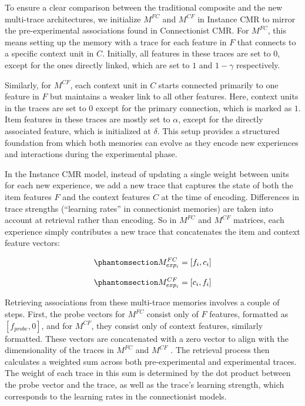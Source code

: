 \documentclass[
  letterpaper,
  11pt,
  english,
  singlespacing,
  headsepline]{MastersDoctoralThesis}
\begin{document}
To ensure a clear comparison between the traditional composite and the
new multi-trace architectures, we initialize \(M^{FC}\) and \(M^{CF}\)
in Instance CMR to mirror the pre-experimental associations found in
Connectionist CMR. For \(M^{FC}\), this means setting up the memory with
a trace for each feature in \(F\) that connects to a specific context
unit in \(C\). Initially, all features in these traces are set to \(0\),
except for the ones directly linked, which are set to \(1\) and
\(1 - \gamma\) respectively.

Similarly, for \(M^{CF}\), each context unit in \(C\) starts connected
primarily to one feature in \(F\) but maintains a weaker link to all
other features. Here, context units in the traces are set to \(0\)
except for the primary connection, which is marked as \(1\). Item
features in these traces are mostly set to \(\alpha\), except for the
directly associated feature, which is initialized at \(\delta\). This
setup provides a structured foundation from which both memories can
evolve as they encode new experiences and interactions during the
experimental phase.

In the Instance CMR model, instead of updating a single weight between
units for each new experience, we add a new trace that captures the
state of both the item features \(F\) and the context features \(C\) at
the time of encoding. Differences in trace strengths (``learning rates''
in connectionist memories) are taken into account at retrieval rather
than encoding. So in \(M^{FC}\) and \(M^{CF}\) matrices, each experience
simply contributes a new trace that concatenates the item and context
feature vectors:

\begin{equation}\phantomsection\label{eq-8}{
M^{FC}_{exp_{i}} = [f_i, c_i]
}\end{equation}

\begin{equation}\phantomsection\label{eq-9}{
M^{CF}_{exp_{i}} = [c_i, f_i]
}\end{equation}

Retrieving associations from these multi-trace memories involves a
couple of steps. First, the probe vectors for \(M^{FC}\) consist only of
\(F\) features, formatted as \([f_{probe}, 0]\), and for \(M^{CF}\),
they consist only of context features, similarly formatted. These
vectors are concatenated with a zero vector to align with the
dimensionality of the traces in \(M^{FC}\) and \(M^{CF}\) . The
retrieval process then calculates a weighted sum across both
pre-experimental and experimental traces. The weight of each trace in
this sum is determined by the dot product between the probe vector and
the trace, as well as the trace's learning strength, which corresponds
to the learning rates in the connectionist models.
\end{document}
